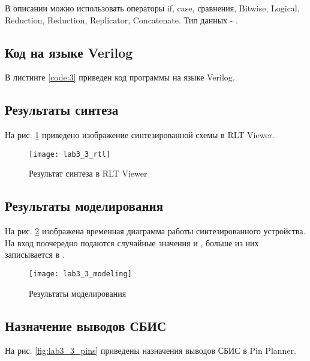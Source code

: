 В описании можно использовать операторы if, case, сравнения, Bitwise, Logical, Reduction, Reduction, Replicator, Concatenate. Тип данных - .

\subsection{Код на языке Verilog}

В листинге \ref{code:3} приведен код программы на языке Verilog.



\subsection{Результаты синтеза}

На рис. \ref{fig:lab3_3_rtl} приведено изображение синтезированной схемы в RLT Viewer.

\begin{figure}[H]
\begin{center}
	\texttt{[image: lab3\_3\_rtl]}
	\caption{Результат синтеза в RLT Viewer}
	\label{fig:lab3_3_rtl}
\end{center}
\end{figure}

\subsection{Результаты моделирования}
\label{sec:lab3_3_modeling}

На рис. \ref{fig:lab3_3_modeling} изображена временная диаграмма работы синтезированного устройства. На вход поочередно подаются случайные значения  и , больше из них записывается в .

\begin{figure}[H]
\begin{center}
	\texttt{[image: lab3\_3\_modeling]}
	\caption{Результаты моделирования}
	\label{fig:lab3_3_modeling}
\end{center}
\end{figure}

\subsection{Назначение выводов СБИС}

На рис. \ref{fig:lab3_3_pins} приведены назначения выводов СБИС в Pin Planner.

